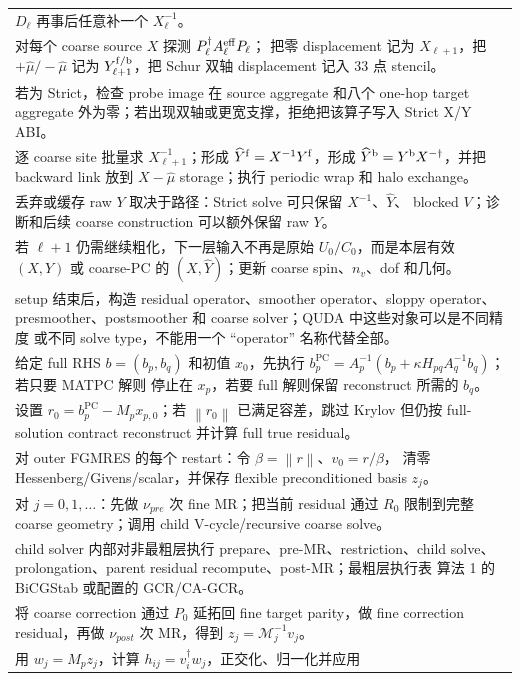 \documentclass[UTF8,a4paper,11pt]{ctexart}
\newcommand{\norm}[1]{\left\lVert#1\right\rVert}
\newcommand{\pc}{\mathrm{PC}}
\newcommand{\Yhat}{\widehat Y}
\begin{document}
\begin{longtable}{@{}p{}@{}}
$D_\ell$ 再事后任意补一个 $X_\ell^{-1}$。\\
对每个 coarse source $X$ 探测 $P_\ell^\dagger A_\ell^{\rm eff}P_\ell$；
把零 displacement 记为 $X_{\ell+1}$，把 $+\hat\mu/-\hat\mu$ 记为
$Y_{\ell+1}^{\rm f/b}$，把 Schur 双轴 displacement 记入 33 点 stencil。\\
若为 Strict，检查 probe image 在 source aggregate 和八个 one-hop target
aggregate 外为零；若出现双轴或更宽支撑，拒绝把该算子写入 Strict X/Y ABI。\\
逐 coarse site 批量求 $X_{\ell+1}^{-1}$；形成
$\Yhat^{\rm f}=X^{-1}Y^{\rm f}$，形成
$\Yhat^{\rm b}=Y^{\rm b}X^{-\dagger}$，并把 backward link 放到
$X-\hat\mu$ storage；执行 periodic wrap 和 halo exchange。\\
丢弃或缓存 raw $Y$ 取决于路径：Strict solve 可只保留 $X^{-1}$、$\Yhat$、
blocked $V$；诊断和后续 coarse construction 可以额外保留 raw $Y$。\\
若 $\ell+1$ 仍需继续粗化，下一层输入不再是原始 $U_0/C_0$，而是本层有效
$(X,Y)$ 或 coarse-PC 的 $(X,\Yhat)$；更新 coarse spin、$n_v$、dof 和几何。\\
setup 结束后，构造 residual operator、smoother operator、sloppy operator、
presmoother、postsmoother 和 coarse solver；QUDA 中这些对象可以是不同精度
或不同 solve type，不能用一个 ``operator'' 名称代替全部。\\
给定 full RHS $b=(b_p,b_q)$ 和初值 $x_0$，先执行
$b_p^{\pc}=A_p^{-1}(b_p+\kappa H_{pq}A_q^{-1}b_q)$；若只要 MATPC 解则
停止在 $x_p$，若要 full 解则保留 reconstruct 所需的 $b_q$。\\
设置 $r_0=b_p^{\pc}-M_px_{p,0}$；若 $\norm{r_0}$ 已满足容差，跳过 Krylov
但仍按 full-solution contract reconstruct 并计算 full true residual。\\
对 outer FGMRES 的每个 restart：令 $\beta=\norm{r}$、$v_0=r/\beta$，
清零 Hessenberg/Givens/scalar，并保存 flexible preconditioned basis $z_j$。\\
对 $j=0,1,\ldots$：先做 $\nu_{pre}$ 次 fine MR；把当前 residual 通过
$R_0$ 限制到完整 coarse geometry；调用 child V-cycle/recursive coarse solve。\\
child solver 内部对非最粗层执行 prepare、pre-MR、restriction、child solve、
prolongation、parent residual recompute、post-MR；最粗层执行表
\textnormal{算法 1} 的 BiCGStab 或配置的 GCR/CA-GCR。\\
将 coarse correction 通过 $P_0$ 延拓回 fine target parity，做 fine correction
residual，再做 $\nu_{post}$ 次 MR，得到 $z_j=\mathcal M_j^{-1}v_j$。\\
用 $w_j=M_pz_j$，计算 $h_{ij}=v_i^\dagger w_j$，正交化、归一化并应用

\end{longtable}
\end{document}
